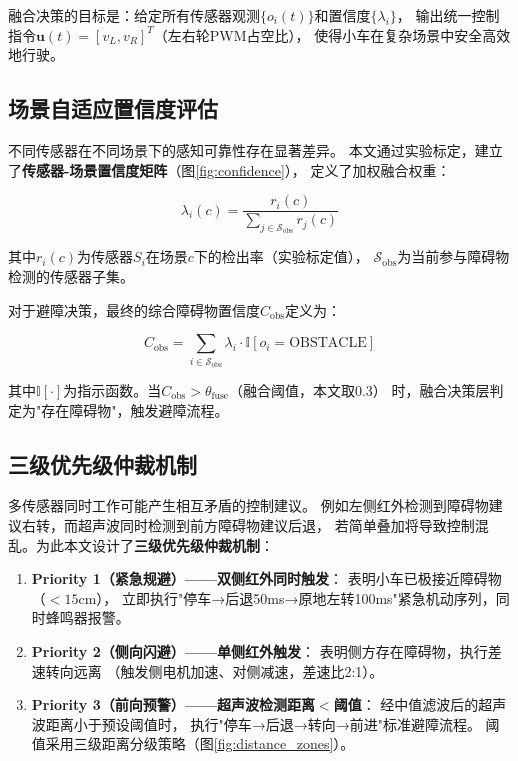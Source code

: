\documentclass[12pt,a4paper]{ctexart}
\begin{document}
融合决策的目标是：给定所有传感器观测$\{o_i(t)\}$和置信度$\{\lambda_i\}$，
输出统一控制指令$\mathbf{u}(t) = [v_L, v_R]^T$（左右轮PWM占空比），
使得小车在复杂场景中安全高效地行驶。

\subsection{场景自适应置信度评估}

不同传感器在不同场景下的感知可靠性存在显著差异。
本文通过实验标定，建立了\textbf{传感器-场景置信度矩阵}（图\ref{fig:confidence}），
定义了加权融合权重：

\begin{equation}
\lambda_i(c) = \frac{r_i(c)}{\sum_{j \in \mathcal{S}_{\text{obs}}} r_j(c)}
\label{eq:confidence}
\end{equation}

其中$r_i(c)$为传感器$S_i$在场景$c$下的检出率（实验标定值），
$\mathcal{S}_{\text{obs}}$为当前参与障碍物检测的传感器子集。

对于避障决策，最终的综合障碍物置信度$C_{\text{obs}}$定义为：

\begin{equation}
C_{\text{obs}} = \sum_{i \in \mathcal{S}_{\text{obs}}} \lambda_i \cdot \mathbb{I}[o_i = \text{OBSTACLE}]
\label{eq:fusion}
\end{equation}

其中$\mathbb{I}[\cdot]$为指示函数。当$C_{\text{obs}} > \theta_{\text{fuse}}$（融合阈值，本文取0.3）
时，融合决策层判定为"存在障碍物"，触发避障流程。

\subsection{三级优先级仲裁机制}

多传感器同时工作可能产生相互矛盾的控制建议。
例如左侧红外检测到障碍物建议右转，而超声波同时检测到前方障碍物建议后退，
若简单叠加将导致控制混乱。为此本文设计了\textbf{三级优先级仲裁机制}：

\begin{enumerate}
    \item \textbf{Priority 1（紧急规避）——双侧红外同时触发}：
          表明小车已极接近障碍物（$<15$cm），
          立即执行"停车→后退50ms→原地左转100ms"紧急机动序列，同时蜂鸣器报警。

    \item \textbf{Priority 2（侧向闪避）——单侧红外触发}：
          表明侧方存在障碍物，执行差速转向远离
          （触发侧电机加速、对侧减速，差速比2:1）。

    \item \textbf{Priority 3（前向预警）——超声波检测距离$<$阈值}：
          经中值滤波后的超声波距离小于预设阈值时，
          执行"停车→后退→转向→前进"标准避障流程。
          阈值采用三级距离分级策略（图\ref{fig:distance_zones}）。
\end{enumerate}
\end{document}
